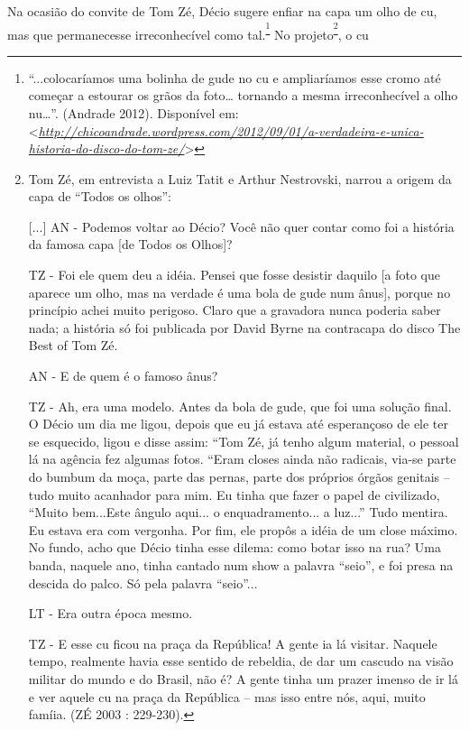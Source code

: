 Na ocasião do convite de Tom Zé, Décio sugere enfiar na capa um olho de
cu, mas que permanecesse irreconhecível como
tal.\textsuperscript{\footnote{``...colocaríamos uma bolinha de gude no
  cu e ampliaríamos esse cromo até começar a estourar os grãos da
  foto\ldots{} tornando a mesma irreconhecível a olho nu\ldots{}''.
  (Andrade 2012). Disponível em:
  \textless{}\href{http://chicoandrade.wordpress.com/2012/09/01/a-verdadeira-e-unica-historia-do-disco-do-tom-ze/}{\emph{http://chicoandrade.wordpress.com/2012/09/01/a-verdadeira-e-unica-historia-do-disco-do-tom-ze/}}\textgreater{}}}
No projeto\textsuperscript{\footnote{Tom Zé, em entrevista a Luiz Tatit
  e Arthur Nestrovski, narrou a origem da capa de ``Todos os olhos'':

  {[}...{]} AN - Podemos voltar ao Décio? Você não quer contar como foi
  a história da famosa capa {[}de Todos os Olhos{]}?

  TZ - Foi ele quem deu a idéia. Pensei que fosse desistir daquilo {[}a
  foto que aparece um olho, mas na verdade é uma bola de gude num
  ânus{]}, porque no princípio achei muito perigoso. Claro que a
  gravadora nunca poderia saber nada; a história só foi publicada por
  David Byrne na contracapa do disco The Best of Tom Zé.

  AN - E de quem é o famoso ânus?

  TZ - Ah, era uma modelo. Antes da bola de gude, que foi uma solução
  final. O Décio um dia me ligou, depois que eu já estava até
  esperançoso de ele ter se esquecido, ligou e disse assim: ``Tom Zé, já
  tenho algum material, o pessoal lá na agência fez algumas fotos.
  ``Eram closes ainda não radicais, via-se parte do bumbum da moça,
  parte das pernas, parte dos próprios órgãos genitais -- tudo muito
  acanhador para mim. Eu tinha que fazer o papel de civilizado, ``Muito
  bem...Este ângulo aqui... o enquadramento... a luz...'' Tudo mentira.
  Eu estava era com vergonha. Por fim, ele propôs a idéia de um close
  máximo. No fundo, acho que Décio tinha esse dilema: como botar isso na
  rua? Uma banda, naquele ano, tinha cantado num show a palavra
  ``seio'', e foi presa na descida do palco. Só pela palavra ``seio''...

  LT - Era outra época mesmo.

  TZ - E esse cu ficou na praça da República! A gente ia lá visitar.
  Naquele tempo, realmente havia esse sentido de rebeldia, de dar um
  cascudo na visão militar do mundo e do Brasil, não é? A gente tinha um
  prazer imenso de ir lá e ver aquele cu na praça da República -- mas
  isso entre nós, aqui, muito famíia. (ZÉ 2003 : 229-230). }}, o cu
